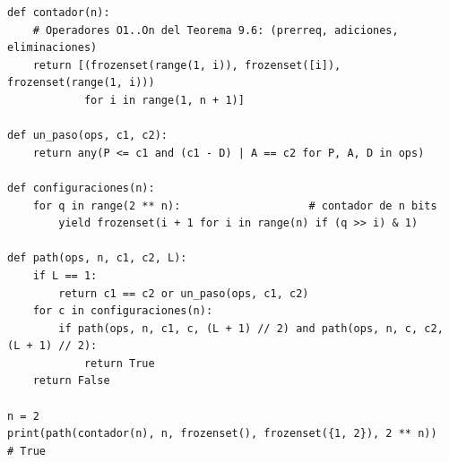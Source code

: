 \documentclass[11pt,letterpaper]{article}
\theoremstyle{plain}
\theoremstyle{definition}
\theoremstyle{remark}
\begin{document}
\begin{small}
\begin{verbatim}
def contador(n):
    # Operadores O1..On del Teorema 9.6: (prerreq, adiciones, eliminaciones)
    return [(frozenset(range(1, i)), frozenset([i]), frozenset(range(1, i)))
            for i in range(1, n + 1)]

def un_paso(ops, c1, c2):
    return any(P <= c1 and (c1 - D) | A == c2 for P, A, D in ops)

def configuraciones(n):
    for q in range(2 ** n):                    # contador de n bits
        yield frozenset(i + 1 for i in range(n) if (q >> i) & 1)

def path(ops, n, c1, c2, L):
    if L == 1:
        return c1 == c2 or un_paso(ops, c1, c2)
    for c in configuraciones(n):
        if path(ops, n, c1, c, (L + 1) // 2) and path(ops, n, c, c2, (L + 1) // 2):
            return True
    return False

n = 2
print(path(contador(n), n, frozenset(), frozenset({1, 2}), 2 ** n))   # True
\end{verbatim}
\end{small}
\end{document}
